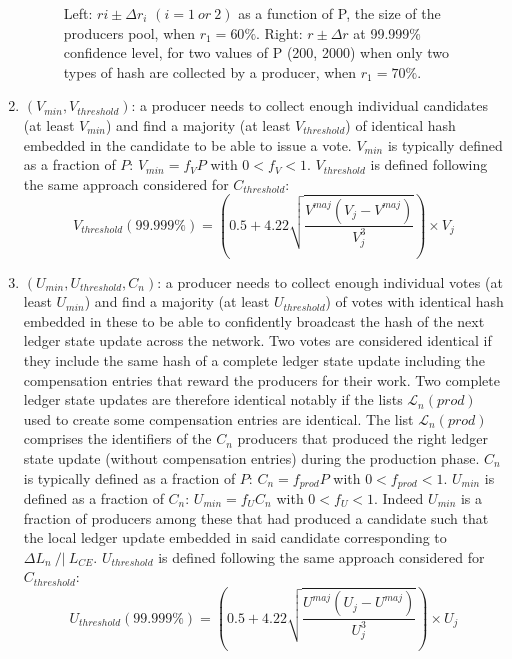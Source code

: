 \begin{enumerate}
\begin{figure}[H]
    \caption{Left: $ri \pm \Delta r_i$ $(i=1~or~2)$ as a function of P, the  size of the producers pool, when $r_1 = 60\%$. Right: $r \pm \Delta r$ at 99.999\% confidence level, for two values of P (200, 2000) when only two types of hash are collected by a producer, when $r_1 = 70\%$.}
    \label{fig:rdeltar}
\end{figure}


\item $(V_{min}, V_{threshold})$: a producer needs to collect enough individual candidates (at least $V_{min}$) and find a majority (at least $V_{threshold}$) of identical hash embedded in the candidate to be able to issue a vote. 
$V_{min}$ is typically defined as a fraction of $P$: $V_{min} = f_V P$ with $0 < f_V < 1$. $V_{threshold}$ is defined following the same approach considered for $C_{threshold}$: 
 \begin{equation}
 V_{threshold}(99.999\%) = \left( 0.5 +  4.22\sqrt{\frac{V^{maj}(V_j-V^{maj})}{V_j^3}} \right) \times V_j
 \end{equation}
 
 \item $(U_{min}, U_{threshold}, C_n)$: a producer needs to collect enough individual votes (at least $U_{min}$) and find a majority (at least $U_{threshold}$) of votes with identical hash embedded in these to be able to confidently broadcast the hash of the next ledger state update across the network. Two votes are considered identical if they include the same hash of a complete ledger state update including the compensation entries that reward the producers for their work. Two complete ledger state updates are therefore identical notably if the lists $\mathcal{L}_{n}(prod)$ used to create some compensation entries are identical. The list $\mathcal{L}_{n}(prod)$ comprises the identifiers of the $C_n$ producers that produced the right ledger state update (without compensation entries) during the production phase. $C_{n}$ is typically defined as a fraction of $P$: $C_{n} = f_{prod}P$ with $0 < f_{prod} < 1$.
 $U_{min}$ is defined as a fraction of $C_n$: $U_{min} = f_U C_n$ with $0 < f_U < 1$. Indeed $U_{min}$ is a fraction of producers among these that had produced a candidate such that the local ledger update embedded in said candidate corresponding to $\Delta L_n~/|~L_{CE}$.  $U_{threshold}$ is defined following the same approach considered for $C_{threshold}$: 
 \begin{equation}
 U_{threshold}(99.999\%) = \left( 0.5 +  4.22\sqrt{\frac{U^{maj}(U_j-U^{maj})}{U_j^3}} \right) \times U_j
 \end{equation}

\end{enumerate}

